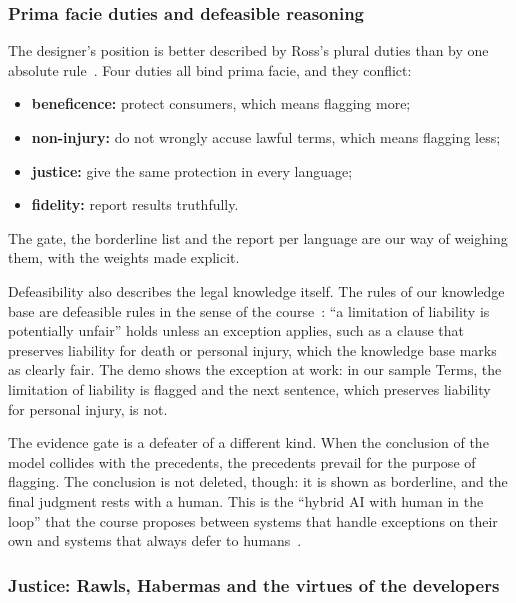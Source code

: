 \subsubsection{Prima facie duties and defeasible reasoning}

The designer's position is better described by Ross's plural duties than by one absolute rule~\citep{ross1930,slides_deontology}. Four duties all bind prima facie, and they conflict:
\begin{itemize}
  \item \textbf{beneficence:} protect consumers, which means flagging more;
  \item \textbf{non-injury:} do not wrongly accuse lawful terms, which means flagging less;
  \item \textbf{justice:} give the same protection in every language;
  \item \textbf{fidelity:} report results truthfully.
\end{itemize}
The gate, the borderline list and the report per language are our way of weighing them, with the weights made explicit.

Defeasibility also describes the legal knowledge itself. The rules of our knowledge base are defeasible rules in the sense of the course~\citep{slides_defeasible}: ``a limitation of liability is potentially unfair'' holds unless an exception applies, such as a clause that preserves liability for death or personal injury, which the knowledge base marks as clearly fair. The demo shows the exception at work: in our sample Terms, the limitation of liability is flagged and the next sentence, which preserves liability for personal injury, is not.

The evidence gate is a defeater of a different kind. When the conclusion of the model collides with the precedents, the precedents prevail for the purpose of flagging. The conclusion is not deleted, though: it is shown as borderline, and the final judgment rests with a human. This is the ``hybrid AI with human in the loop'' that the course proposes between systems that handle exceptions on their own and systems that always defer to humans~\citep{slides_deontology}.

\subsubsection{Justice: Rawls, Habermas and the virtues of the developers}

